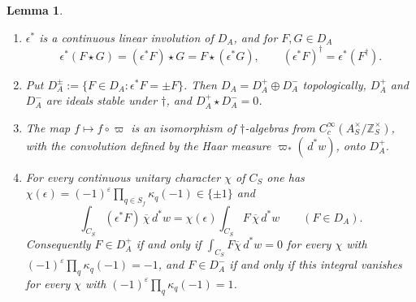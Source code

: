 \documentclass[11pt]{amsart}
\newtheorem{lemma}[theorem]{Lemma}
\theoremstyle{definition}
\theoremstyle{remark}
\newcommand{\Z}{\mathbb Z}
\newcommand{\dstar}{\,d^{*}}
\newcommand{\DA}{D_A}
\begin{document}
\begin{lemma}\label{lem:epsilon}
\begin{enumerate}
\item[(a)] $\epsilon^{*}$ is a continuous linear involution of $\DA$, and
for $F,G\in\DA$
\[
\epsilon^{*}(F\star G)=(\epsilon^{*}F)\star G=F\star(\epsilon^{*}G),\qquad
(\epsilon^{*}F)^{\dagger}=\epsilon^{*}(F^{\dagger}).
\]
\item[(b)] Put $\DA^{\pm}:=\{F\in\DA:\epsilon^{*}F=\pm F\}$.  Then
$\DA=\DA^{+}\oplus\DA^{-}$ topologically, $\DA^{+}$ and $\DA^{-}$ are
ideals stable under $\dagger$, and $\DA^{+}\star\DA^{-}=0$.
\item[(c)] The map $f\mapsto f\circ\varpi$ is an isomorphism of
$\dagger$-algebras from $C_c^{\infty}(A_S^{\times}/\Z_S^{\times})$, with the
convolution defined by the Haar measure $\varpi_{*}(\dstar w)$, onto
$\DA^{+}$.
\item[(d)] For every continuous unitary character $\chi$ of $C_S$ one has
$\chi(\epsilon)=(-1)^{\varepsilon}\prod_{q\in S_f}\kappa_q(-1)\in\{\pm1\}$
and
\[
\int_{C_S}(\epsilon^{*}F)\,\overline{\chi}\dstar w
=\chi(\epsilon)\int_{C_S}F\,\overline{\chi}\dstar w\qquad(F\in\DA).
\]
Consequently $F\in\DA^{+}$ if and only if
$\int_{C_S}F\overline{\chi}\dstar w=0$ for every $\chi$ with
$(-1)^{\varepsilon}\prod_q\kappa_q(-1)=-1$, and $F\in\DA^{-}$ if and only if
this integral vanishes for every $\chi$ with
$(-1)^{\varepsilon}\prod_q\kappa_q(-1)=1$.
\end{enumerate}
\end{lemma}
\end{document}
